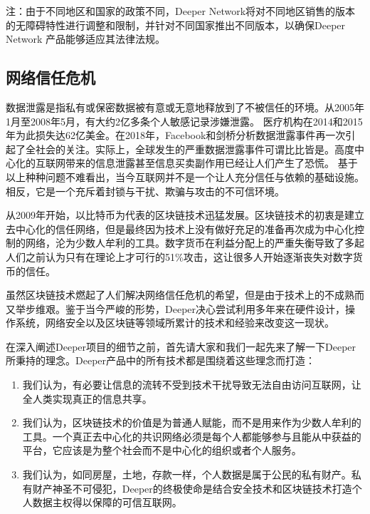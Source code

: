 \documentclass[a4paper]{article}
\begin{document}
\noindent 注：由于不同地区和国家的政策不同，Deeper Network将对不同地区销售的版本的无障碍特性进行调整和限制，并针对不同国家推出不同版本，以确保Deeper Network 产品能够适应其法律法规。

\subsection{网络信任危机}
数据泄露是指私有或保密数据被有意或无意地释放到了不被信任的环境\cite{data-breach}。从2005年1月至2008年5月，有大约2亿多条个人敏感记录涉嫌泄露\cite{data-breach-list}。 医疗机构在2014和2015年为此损失达62亿美金\cite{data-breach-healthcare}。在2018年，Facebook和剑桥分析数据泄露事件\cite{facebook-cambridge}再一次引起了全社会的关注。实际上，全球发生的严重数据泄露事件可谓比比皆是\cite{list-data-breach}。高度中心化的互联网带来的信息泄露甚至信息买卖副作用已经让人们产生了恐慌\cite{privacy-fears}。
基于以上种种问题不难看出，当今互联网并不是一个让人充分信任与依赖的基础设施。相反，它是一个充斥着封锁与干扰、欺骗与攻击的不可信环境。

从2009年开始，以比特币为代表的区块链技术迅猛发展。区块链技术的初衷是建立去中心化的信任网络，但是最终因为技术上没有做好充足的准备再次成为中心化控制的网络\cite{bitcoin-centralized}\cite{blockchain-centralized}，沦为少数人牟利的工具。数字货币在利益分配上的严重失衡\cite{hashrate-distribution}导致了多起人们之前认为只有在理论上才可行的51\%攻击\cite{51-attack}，这让很多人开始逐渐丧失对数字货币的信任\cite{never-invest-bitcoin}。

虽然区块链技术燃起了人们解决网络信任危机的希望，但是由于技术上的不成熟而又举步维艰。鉴于当今严峻的形势，Deeper决心尝试利用多年来在硬件设计，操作系统，网络安全以及区块链等领域所累计的技术和经验来改变这一现状。

在深入阐述Deeper项目的细节之前，首先请大家和我们一起先来了解一下Deeper所秉持的理念。Deeper产品中的所有技术都是围绕着这些理念而打造：
\begin{enumerate}
\item 我们认为，有必要让信息的流转不受到技术干扰导致无法自由访问互联网，让全人类实现真正的信息共享。
\item 我们认为，区块链技术的价值是为普通人赋能，而不是用来作为少数人牟利的工具。一个真正去中心化的共识网络必须是每个人都能够参与且能从中获益的平台，它应该是为整个社会而不是中心化的组织或者个人服务。
\item 我们认为，如同房屋，土地，存款一样，个人数据是属于公民的私有财产。私有财产神圣不可侵犯，Deeper的终极使命是结合安全技术和区块链技术打造个人数据主权得以保障的可信互联网。
\end{enumerate}
\end{document}
